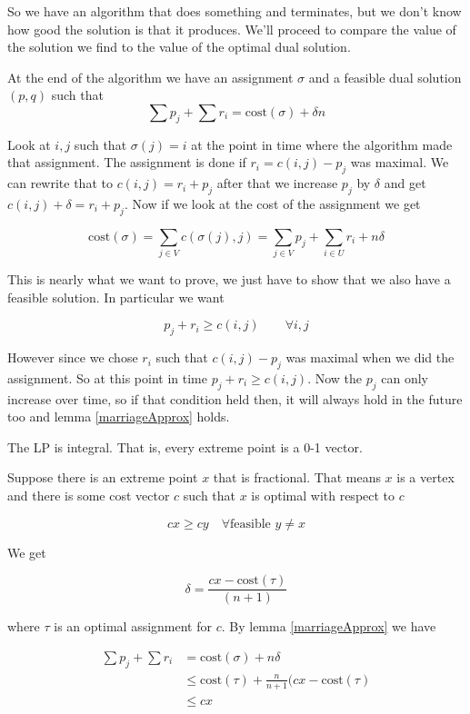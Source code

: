 So we have an algorithm that does something and terminates, but we don't know how good the solution is that it produces. We'll proceed to compare the value of the solution we find to the value of the optimal dual solution.

\begin{lem}\label{marriageApprox} At the end of the algorithm we have an assignment $\sigma$ and a feasible dual solution $(p,q)$ such that
\[\sum p_j + \sum r_i = \text{cost}(\sigma) + \delta n\]
\end{lem}
\begin{pr}
Look at $i,j$ such that $\sigma(j)=i$ at the point in time where the algorithm made that assignment. The assignment is done if $r_i=c(i,j)-p_j$ was maximal. We can rewrite that to $c(i,j) = r_i+p_j$ after that we increase $p_j$ by $\delta$ and get $c(i,j) +\delta = r_i+p_j$. Now if we look at the cost of the assignment we get

\[\text{cost}(\sigma) = \sum_{j\in V} c(\sigma(j),j) = \sum_{j\in V} p_j + \sum_{i\in U} r_i + n\delta\]

This is nearly what we want to prove, we just have to show that we also have a feasible solution. In particular we want

\[p_j+r_i \geq c(i,j) \qquad \forall i,j\]

However since we chose $r_i$ such that $c(i,j)-p_j$ was maximal when we did the assignment. So at this point in time $p_j + r_i \geq c(i,j)$. Now the $p_j$ can only increase over time, so if that condition held then, it will always hold in the future too and lemma \ref{marriageApprox} holds.
\end{pr}

\begin{cor} The LP is integral. That is, every extreme point is a 0-1 vector.\end{cor}

\begin{pr} Suppose there is an extreme point $x$ that is fractional. That means $x$ is a vertex and there is some cost vector $c$ such that $x$ is optimal with respect to $c$

\[cx \geq cy \quad \forall \text{feasible } y\neq x\]

We get

\[\delta = \frac{cx - \text{cost}(\tau)}{(n+1)}\]

where $\tau$ is an optimal assignment for $c$. By lemma \ref{marriageApprox} we have

\begin{align*}
\sum p_j + \sum r_i &= \text{cost}(\sigma) + n\delta \\
 &\leq \text{cost}(\tau) + \frac{n}{n+1} (cx-\text{cost}(\tau)\\
 &\leq cx
\end{align*}

\end{pr}

